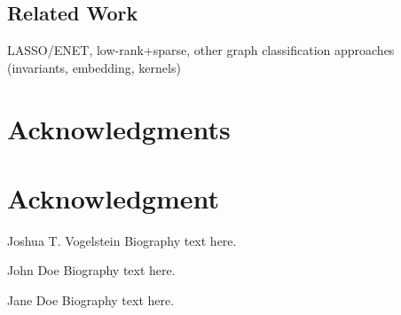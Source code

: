 \documentclass[10pt,journal,cspaper,compsoc]{IEEEtran}
\begin{document}

\subsection{Related Work} %
\label{sub:related_work}

LASSO/ENET, low-rank+sparse, other graph classification approaches (invariants, embedding, kernels) \cite{PCP10}




% 

\ifCLASSOPTIONcompsoc
  \section*{Acknowledgments}
\else
  \section*{Acknowledgment}
\fi


\ifCLASSOPTIONcaptionsoff
  \newpage
\fi





\begin{IEEEbiography}{Joshua T. Vogelstein}
Biography text here.
\end{IEEEbiography}

\begin{IEEEbiographynophoto}{John Doe}
Biography text here.
\end{IEEEbiographynophoto}


\begin{IEEEbiographynophoto}{Jane Doe}
Biography text here.
\end{IEEEbiographynophoto}

\end{document}

